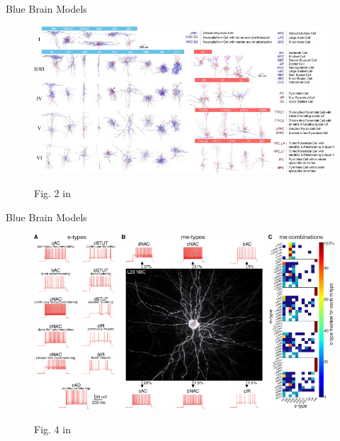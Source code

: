 \documentclass{beamer}
\begin{document}
\begin{frame}{Blue Brain Models}
    \begin{figure}
        \centering
        \includegraphics[width=\textwidth]{images/m-types.jpg}\\
        \caption{\centering Fig. 2 in \textcite{markram_reconstruction_2015}}
    \end{figure}
\end{frame}

\begin{frame}{Blue Brain Models}
    \begin{figure}
        \centering
        \includegraphics[width=\textwidth]{images/e-types.jpg}\\
        \caption{\centering Fig. 4 in \textcite{markram_reconstruction_2015}}
    \end{figure}
\end{frame}

\end{document}
